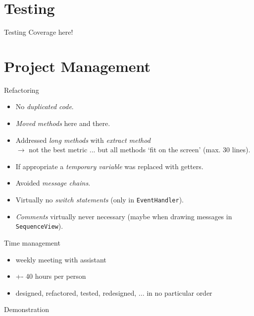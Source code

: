 \documentclass[10pt]{beamer}
\begin{document}
\begin{frame}[fragile]{}
	\begin{center}
	
	\end{center}
\end{frame}

\section{Testing}

\begin{frame}[fragile]{Testing}
	Coverage here!
\end{frame}

\section{Project Management}


\begin{frame}[fragile]{Refactoring}
\begin{itemize}
\item No \textit{duplicated code}.
\item \textit{Moved methods} here and there.
\item Addressed \textit{long methods} with \textit{extract method} \\
$\rightarrow$ not the best metric ... but all methods `fit on the screen' (max. 30 lines).
\item If appropriate a \textit{temporary variable} was replaced with getters.
\item Avoided \textit{message chains}.
\item Virtually no \textit{switch statements} (only in \texttt{EventHandler}).
\item \textit{Comments} virtually never necessary (maybe when drawing messages in \texttt{SequenceView}).
\end{itemize}
\end{frame}

\begin{frame}[fragile]{Time management}
\begin{itemize}
\item weekly meeting with assistant
\item +- 40 hours per person
\item designed, refactored, tested, redesigned, ... in no particular order
\end{itemize}
\end{frame}

{
\begin{frame}[standout]
  Demonstration
\end{frame}
}
\end{document}
